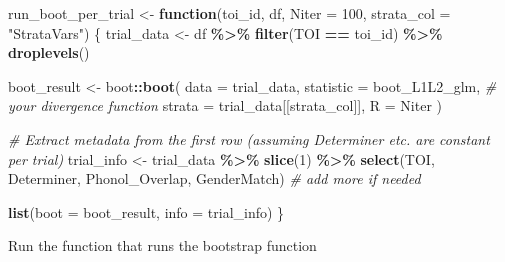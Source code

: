 \documentclass[
]{article}
\newenvironment{Shaded}{\begin{snugshade}}{\end{snugshade}}
\newcommand{\AttributeTok}[1]{\textcolor[rgb]{0.13,0.29,0.53}{#1}}
\newcommand{\CommentTok}[1]{\textcolor[rgb]{0.56,0.35,0.01}{\textit{#1}}}
\newcommand{\ControlFlowTok}[1]{\textcolor[rgb]{0.13,0.29,0.53}{\textbf{#1}}}
\newcommand{\DecValTok}[1]{\textcolor[rgb]{0.00,0.00,0.81}{#1}}
\newcommand{\FunctionTok}[1]{\textcolor[rgb]{0.13,0.29,0.53}{\textbf{#1}}}
\newcommand{\NormalTok}[1]{#1}
\newcommand{\OtherTok}[1]{\textcolor[rgb]{0.56,0.35,0.01}{#1}}
\newcommand{\SpecialCharTok}[1]{\textcolor[rgb]{0.81,0.36,0.00}{\textbf{#1}}}
\newcommand{\StringTok}[1]{\textcolor[rgb]{0.31,0.60,0.02}{#1}}
\begin{document}
\begin{Shaded}
\begin{Highlighting}[]
\NormalTok{run\_boot\_per\_trial }\OtherTok{\textless{}{-}} \ControlFlowTok{function}\NormalTok{(toi\_id, df, }\AttributeTok{Niter =} \DecValTok{100}\NormalTok{, }\AttributeTok{strata\_col =} \StringTok{"StrataVars"}\NormalTok{) \{}
\NormalTok{  trial\_data }\OtherTok{\textless{}{-}}\NormalTok{ df }\SpecialCharTok{\%\textgreater{}\%} \FunctionTok{filter}\NormalTok{(TOI }\SpecialCharTok{==}\NormalTok{ toi\_id) }\SpecialCharTok{\%\textgreater{}\%} \FunctionTok{droplevels}\NormalTok{()}

\NormalTok{  boot\_result }\OtherTok{\textless{}{-}}\NormalTok{ boot}\SpecialCharTok{::}\FunctionTok{boot}\NormalTok{(}
    \AttributeTok{data =}\NormalTok{ trial\_data,}
    \AttributeTok{statistic =}\NormalTok{ boot\_L1L2\_glm,  }\CommentTok{\# your divergence function}
    \AttributeTok{strata =}\NormalTok{ trial\_data[[strata\_col]],}
    \AttributeTok{R =}\NormalTok{ Niter}
\NormalTok{  )}

  \CommentTok{\# Extract metadata from the first row (assuming Determiner etc. are constant per trial)}
\NormalTok{  trial\_info }\OtherTok{\textless{}{-}}\NormalTok{ trial\_data }\SpecialCharTok{\%\textgreater{}\%}
    \FunctionTok{slice}\NormalTok{(}\DecValTok{1}\NormalTok{) }\SpecialCharTok{\%\textgreater{}\%}
    \FunctionTok{select}\NormalTok{(TOI, Determiner, Phonol\_Overlap, GenderMatch)  }\CommentTok{\# add more if needed}

  \FunctionTok{list}\NormalTok{(}\AttributeTok{boot =}\NormalTok{ boot\_result, }\AttributeTok{info =}\NormalTok{ trial\_info)}
\NormalTok{\}}
\end{Highlighting}
\end{Shaded}

Run the function that runs the bootstrap function

\begin{Shaded}
\end{Shaded}
\end{document}
